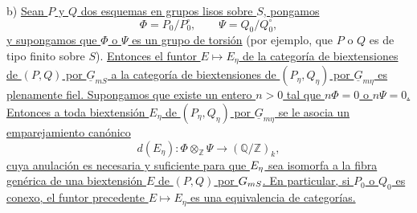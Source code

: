 \smallskip
\noindent b) \underline{Sean $P$ y $Q$ dos esquemas en grupos lisos
sobre $S$, pongamos}
\[
 \Phi=P_0/P_0^{\circ},\qquad \Psi=Q_0/Q_0^{\circ},
\]
\underline{y supongamos que $\Phi$ o $\Psi$ es un grupo de torsión}
(por ejemplo, que $P$ o $Q$ es de tipo finito sobre $S$).
\underline{Entonces el funtor $E\mapsto E_\eta$ de la categoría de
biextensiones de $(P,Q)$ por $\underline G_{mS}$ a la categoría de
biextensiones de $(P_\eta,Q_\eta)$ por $\underline G_{m\eta}$ es
plenamente fiel. Supongamos que existe un entero $n>0$ tal que
$n\Phi=0$ o $n\Psi=0$. Entonces a toda biextensión $E_\eta$ de
$(P_\eta,Q_\eta)$ por $\underline G_{m\eta}$ se le asocia un
emparejamiento canónico}
\begin{equation}\tag{7.1.2}
 d(E_\eta):\Phi\otimes_{\mathbb Z}\Psi
 \longrightarrow(\mathbb Q/\mathbb Z)_k,
\end{equation}
\underline{cuya anulación es necesaria y suficiente para que
$\sisi{E}{E_\eta}$ sea isomorfa a la fibra genérica de una biextensión
$E$ de $(P,Q)$ por
$\sisi{\underline G_{mS}}{\underline G_{mS}}$. En particular, si
$P_0$ o $Q_0$ es conexo, el funtor precedente $E\mapsto E_\eta$ es una
equivalencia de categorías.}
